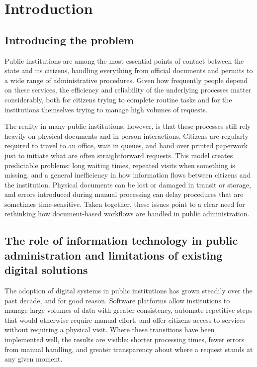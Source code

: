 \chapter{Introduction}
\label{intro}

\section{Introducing the problem}

\par Public institutions are among the most essential points of contact between the state and its citizens, handling everything from official documents and permits to a wide range of administrative procedures. Given how frequently people depend on these services, the efficiency and reliability of the underlying processes matter considerably, both for citizens trying to complete routine tasks and for the institutions themselves trying to manage high volumes of requests.

\par The reality in many public institutions, however, is that these processes still rely heavily on physical documents and in-person interactions. Citizens are regularly required to travel to an office, wait in queues, and hand over printed paperwork just to initiate what are often straightforward requests. This model creates predictable problems: long waiting times, repeated visits when something is missing, and a general inefficiency in how information flows between citizens and the institution. Physical documents can be lost or damaged in transit or storage, and errors introduced during manual processing can delay procedures that are sometimes time-sensitive. Taken together, these issues point to a clear need for rethinking how document-based workflows are handled in public administration.

\section{The role of information technology in public administration and limitations of existing digital solutions}

\par The adoption of digital systems in public institutions has grown steadily over the past decade, and for good reason. Software platforms allow institutions to manage large volumes of data with greater consistency, automate repetitive steps that would otherwise require manual effort, and offer citizens access to services without requiring a physical visit. Where these transitions have been implemented well, the results are visible: shorter processing times, fewer errors from manual handling, and greater transparency about where a request stands at any given moment.

